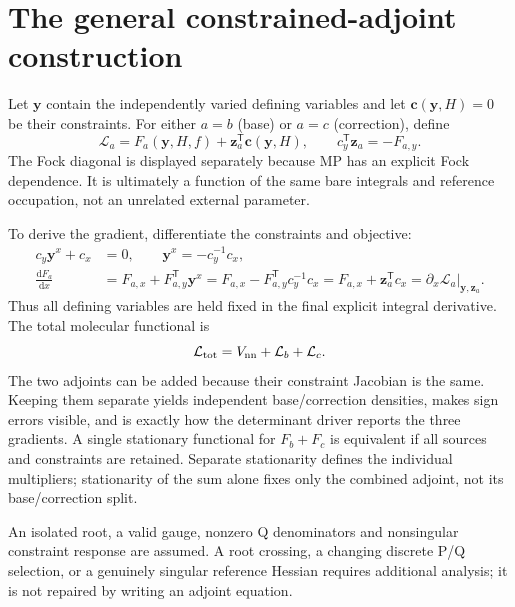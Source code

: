 \documentclass[11pt,letterpaper]{article}
\numberwithin{equation}{section}
\newcommand{\T}{\mathsf T}
\newcommand{\dd}{\mathrm d}
\newcommand{\vecz}{\mathbf z}
\begin{document}
\section{The general constrained-adjoint construction}
\label{sec:adjoint}
Let $\bm y$ contain the independently varied defining variables and let
$\bm c(\bm y,H)=0$ be their constraints. For either $a=b$ (base) or
$a=c$ (correction), define
\begin{equation}
 \boxed{\mathcal L_a=F_a(\bm y,H,f)+\vecz_a^{\T}\bm c(\bm y,H),\qquad
 c_y^{\T}\vecz_a=-F_{a,y}.}
 \label{eq:masterfunctional}
\end{equation}
The Fock diagonal is displayed separately because MP has an explicit Fock
dependence. It is ultimately a function of the same bare integrals and
reference occupation, not an unrelated external parameter.

To derive the gradient, differentiate the constraints and objective:
\begin{align}
 c_y\bm y^x+c_x&=0,\qquad \bm y^x=-c_y^{-1}c_x,\\
 \frac{\dd F_a}{\dd x}
 &=F_{a,x}+F_{a,y}^{\T}\bm y^x
   =F_{a,x}-F_{a,y}^{\T}c_y^{-1}c_x
   =F_{a,x}+\vecz_a^{\T}c_x
   =\left.\partial_x\mathcal L_a\right|_{\bm y,\vecz_a}.
 \label{eq:adjointproof}
\end{align}
Thus all defining variables are held fixed in the final explicit integral
derivative. The total molecular functional is
\begin{equation}
 \mathcal L_{\rm tot}=V_{\rm nn}+\mathcal L_b+\mathcal L_c.
 \label{eq:separatefunctionals}
\end{equation}
The two adjoints can be added because their constraint Jacobian is the same.
Keeping them separate yields independent base/correction densities, makes
sign errors visible, and is exactly how the determinant driver reports the
three gradients. A single stationary functional for $F_b+F_c$ is equivalent
if all sources and constraints are retained.
Separate stationarity defines the individual multipliers; stationarity of
the sum alone fixes only the combined adjoint, not its base/correction split.

An isolated root, a valid gauge, nonzero Q denominators and nonsingular
constraint response are assumed. A root crossing, a changing discrete P/Q
selection, or a genuinely singular reference Hessian requires additional
analysis; it is not repaired by writing an adjoint equation.
\end{document}
